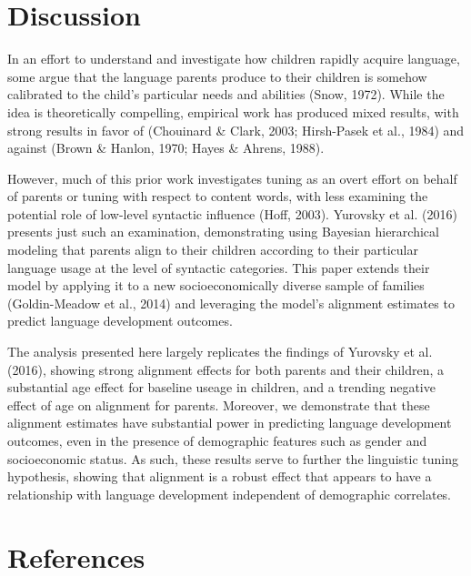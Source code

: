 \documentclass[10pt, letterpaper]{article}
\begin{document}
\hypertarget{discussion}{%
\section{Discussion}\label{discussion}}

In an effort to understand and investigate how children rapidly acquire
language, some argue that the language parents produce to their children
is somehow calibrated to the child's particular needs and abilities
(Snow, 1972). While the idea is theoretically compelling, empirical work
has produced mixed results, with strong results in favor of (Chouinard
\& Clark, 2003; Hirsh-Pasek et al., 1984) and against (Brown \& Hanlon,
1970; Hayes \& Ahrens, 1988).

However, much of this prior work investigates tuning as an overt effort
on behalf of parents or tuning with respect to content words, with less
examining the potential role of low-level syntactic influence (Hoff,
2003). Yurovsky et al. (2016) presents just such an examination,
demonstrating using Bayesian hierarchical modeling that parents align to
their children according to their particular language usage at the level
of syntactic categories. This paper extends their model by applying it
to a new socioeconomically diverse sample of families (Goldin-Meadow et
al., 2014) and leveraging the model's alignment estimates to predict
language development outcomes.

The analysis presented here largely replicates the findings of Yurovsky
et al. (2016), showing strong alignment effects for both parents and
their children, a substantial age effect for baseline useage in
children, and a trending negative effect of age on alignment for
parents. Moreover, we demonstrate that these alignment estimates have
substantial power in predicting language development outcomes, even in
the presence of demographic features such as gender and socioeconomic
status. As such, these results serve to further the linguistic tuning
hypothesis, showing that alignment is a robust effect that appears to
have a relationship with language development independent of demographic
correlates.

\hypertarget{references}{%
\section{References}\label{references}}

\setlength{\parindent}{-0.1in} 
\setlength{\leftskip}{0.125in}

\noindent
\end{document}
